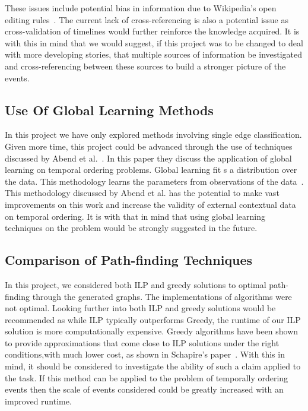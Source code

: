 \documentclass[bsc,frontabs,twoside,singlespacing,parskip,deptreport]{infthesis}     %
\begin{document}
These issues include potential bias in information due to Wikipedia's open editing rules~\cite{wikipediaeditrules}. The current lack of
cross-referencing is also a potential issue as cross-validation of timelines would further reinforce the knowledge acquired.
It is with this in mind that we would suggest, if this project was to be changed to deal with more developing stories, that
multiple sources of  information be investigated and cross-referencing between these sources to build a stronger picture of
the events.


\subsection{Use Of Global Learning Methods}
In this project we have only explored methods involving single edge classification. Given more time,
this project could be advanced through the use of techniques discussed by Abend et al.~\cite{abend2015lexical}.
In this paper they discuss the application of global learning on temporal ordering problems. Global learning
fit s a distribution over the data. This methodology learns the parameters from observations of the data~\cite{Huang2008}.
This methodology discussed by Abend et al. has the potential to make vast improvements on this work and increase the validity
of external contextual data on temporal ordering. It is with that in mind that using global learning techniques on the problem
would be strongly suggested in the future.

\subsection{Comparison of Path-finding Techniques}
In this project, we considered both ILP and greedy solutions to optimal path-finding through the generated graphs.
The implementations of algorithms were not optimal. Looking further into both ILP and greedy solutions would
be recommended as while ILP typically outperforms Greedy, the runtime of our ILP solution is more computationally
expensive. Greedy algorithms have been shown to provide approximations that come close to ILP solutions under the right
conditions,with much lower cost, as shown in Schapire's paper~\cite{schapire1998learning}. With this in mind,
it should be considered to investigate the ability of such a claim applied to the task. If this method can
be applied to the problem of temporally ordering events then the scale of events considered could be greatly increased with
an improved runtime.
\end{document}

